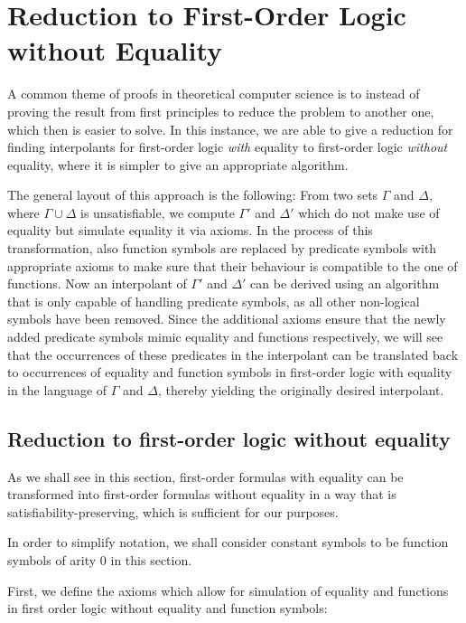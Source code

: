 \chapter{Reduction to First-Order Logic without Equality}

A common theme of proofs in theoretical computer science is to instead of proving the result from first principles to reduce the problem to another one, which then is easier to solve.
In this instance, we are able to give a reduction for finding interpolants for first-order logic \emph{with} equality to first-order logic \emph{without} equality, where it is simpler to give an appropriate algorithm.

The general layout of this approach is the following:
From two sets $\Gamma$ and $\Delta$, where $\Gamma \cup \Delta$ is unsatisfiable, we compute $\Gamma'$ and $\Delta'$ which do not make use of equality but simulate equality it via axioms.
In the process of this transformation, also function symbols are replaced by predicate symbols with appropriate axioms to make sure that their behaviour is compatible to the one of functions.
Now an interpolant of $\Gamma'$ and $\Delta'$ can be derived using an algorithm that is only capable of handling predicate symbols, as all other non-logical symbols have been removed.
Since the additional axioms ensure that the newly added predicate symbols mimic equality and functions respectively, we will see that the occurrences of these predicates in the interpolant can be translated back to occurrences of equality and function symbols in first-order logic with equality in the language of $\Gamma$ and $\Delta$, thereby yielding the originally desired interpolant.


\section{Reduction to first-order logic without equality}

As we shall see in this section, first-order formulas with equality can be transformed into first-order formulas without equality in a way that is satisfiability-preserving, which is sufficient for our purposes.

In order to simplify notation, we shall consider constant symbols to be function symbols of arity $0$ in this section.

First, we define the axioms which allow for simulation of equality and functions in first order logic without equality and function symbols:

